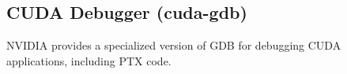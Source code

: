 \subsection{CUDA Debugger (cuda-gdb)}

NVIDIA provides a specialized version of GDB for debugging CUDA applications, including PTX code.

